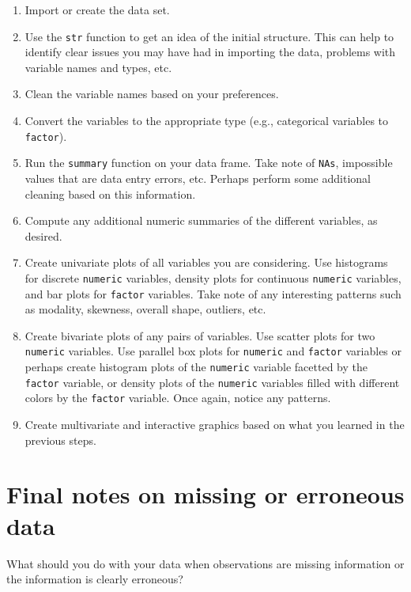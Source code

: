 \documentclass[
]{book}
\providecommand{\tightlist}{%
  \setlength{\itemsep}{0pt}\setlength{\parskip}{0pt}}
\theoremstyle{definition}
\theoremstyle{definition}
\theoremstyle{definition}
\theoremstyle{definition}
\theoremstyle{remark}
\begin{document}
\begin{enumerate}
\def\labelenumi{\arabic{enumi}.}
\tightlist
\item
  Import or create the data set.
\item
  Use the \texttt{str} function to get an idea of the initial structure. This can help to identify clear issues you may have had in importing the data, problems with variable names and types, etc.
\item
  Clean the variable names based on your preferences.
\item
  Convert the variables to the appropriate type (e.g., categorical variables to \texttt{factor}).
\item
  Run the \texttt{summary} function on your data frame. Take note of \texttt{NAs}, impossible values that are data entry errors, etc. Perhaps perform some additional cleaning based on this information.
\item
  Compute any additional numeric summaries of the different variables, as desired.
\item
  Create univariate plots of all variables you are considering. Use histograms for discrete \texttt{numeric} variables, density plots for continuous \texttt{numeric} variables, and bar plots for \texttt{factor} variables. Take note of any interesting patterns such as modality, skewness, overall shape, outliers, etc.
\item
  Create bivariate plots of any pairs of variables. Use scatter plots for two \texttt{numeric} variables. Use parallel box plots for \texttt{numeric} and \texttt{factor} variables or perhaps create histogram plots of the \texttt{numeric} variable facetted by the \texttt{factor} variable, or density plots of the \texttt{numeric} variables filled with different colors by the \texttt{factor} variable. Once again, notice any patterns.
\item
  Create multivariate and interactive graphics based on what you learned in the previous steps.
\end{enumerate}

\hypertarget{final-notes-on-missing-or-erroneous-data}{%
\section{Final notes on missing or erroneous data}\label{final-notes-on-missing-or-erroneous-data}}

What should you do with your data when observations are missing information or the information is clearly erroneous?
\end{document}
